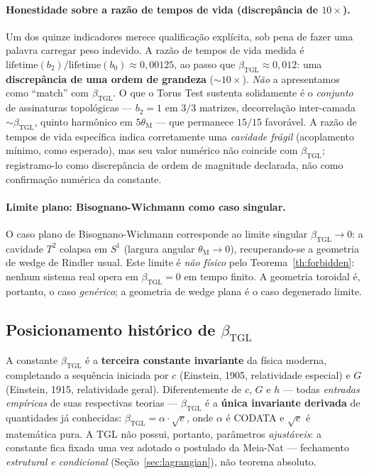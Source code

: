 \documentclass[12pt,a4paper]{article}
\newcommand{\betatgl}{\beta_{\text{TGL}}}
\newcommand{\thetaM}{\theta_{\text{M}}}
\newcommand{\TGL}{\textsc{TGL}}
\begin{document}
\paragraph{Honestidade sobre a razão de tempos de vida (discrepância de $10\times$).}
Um dos quinze indicadores merece qualificação explícita, sob pena de fazer uma
palavra carregar peso indevido.  A razão de tempos de vida medida é
$\text{lifetime}(b_{2})/\text{lifetime}(b_{0}) \approx 0{,}00125$, ao passo que
$\betatgl \approx 0{,}012$: uma \textbf{discrepância de uma ordem de grandeza}
($\sim 10\times$).  \emph{Não} a apresentamos como ``match'' com $\betatgl$.  O
que o Torus Test sustenta solidamente é o \emph{conjunto} de assinaturas
topológicas --- $b_{2}=1$ em $3/3$ matrizes, decorrelação inter-camada
$\sim \betatgl$, quinto harmônico em $5\thetaM$ --- que permanece $15/15$
favorável.  A razão de tempos de vida específica indica corretamente uma
\emph{cavidade frágil} (acoplamento mínimo, como esperado), mas seu valor
numérico não coincide com $\betatgl$; registramo-lo como discrepância de ordem
de magnitude declarada, não como confirmação numérica da constante.

\paragraph{Limite plano: Bisognano-Wichmann como caso singular.}
O caso plano de Bisognano-Wichmann corresponde ao limite singular
$\betatgl \to 0$: a cavidade $T^{2}$ colapsa em $S^{1}$ (largura angular
$\thetaM \to 0$), recuperando-se a geometria de wedge de Rindler usual.
Este limite é \emph{não físico} pelo Teorema~\ref{th:forbidden}: nenhum
sistema real opera em $\betatgl = 0$ em tempo finito.  A geometria
toroidal é, portanto, o caso \emph{genérico}; a geometria de wedge plana
é o caso degenerado limite.

\subsection{Posicionamento histórico de $\betatgl$}
\label{sec:radical-historical}
\label{sec:beta-posicionamento}

A constante $\betatgl$ é a \textbf{terceira constante invariante} da
física moderna, completando a sequência iniciada por $c$ (Einstein, 1905,
relatividade especial) e $G$ (Einstein, 1915, relatividade geral).
Diferentemente de $c$, $G$ e $h$ --- todas \emph{entradas empíricas} de
suas respectivas teorias --- $\betatgl$ é a \textbf{única invariante
derivada} de quantidades já conhecidas: $\betatgl = \alpha \cdot \sqrt{e}$,
onde $\alpha$ é CODATA e $\sqrt{e}$ é matemática pura.  A \TGL{} não possui,
portanto, parâmetros \emph{ajustáveis}: a constante fica fixada uma vez
adotado o postulado da Meia-Nat --- fechamento \emph{estrutural e
condicional} (Seção~\ref{sec:lagrangian}), não teorema absoluto.
\end{document}
